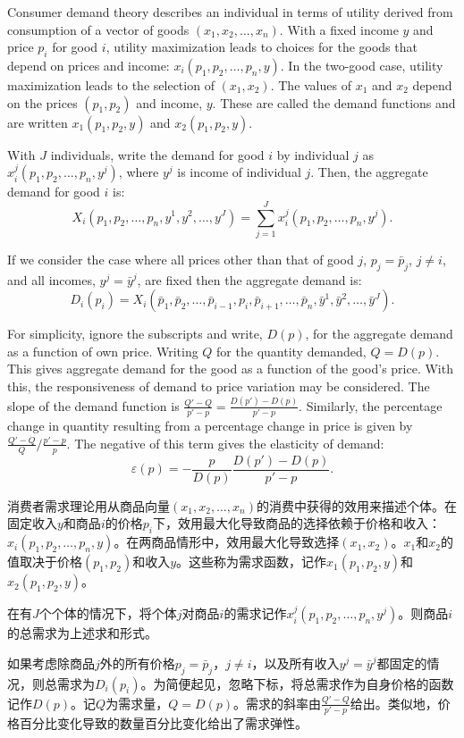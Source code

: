\begin{original}
Consumer demand theory describes an individual in terms of utility derived from consumption of a vector of goods $(x_1, x_2, \ldots, x_n)$. With a fixed income $y$ and price $p_i$ for good $i$, utility maximization leads to choices for the goods that depend on prices and income: $x_i(p_1, p_2, \ldots, p_n, y)$. In the two-good case, utility maximization leads to the selection of $(x_1, x_2)$. The values of $x_1$ and $x_2$ depend on the prices $(p_1, p_2)$ and income, $y$. These are called the demand functions and are written $x_1(p_1, p_2, y)$ and $x_2(p_1, p_2, y)$.

With $J$ individuals, write the demand for good $i$ by individual $j$ as $x_i^j(p_1, p_2, \ldots, p_n, y^j)$, where $y^j$ is income of individual $j$. Then, the aggregate demand for good $i$ is:
\[
X_i(p_1, p_2, \ldots, p_n, y^1, y^2, \ldots, y^J) = \sum_{j=1}^{J} x_i^j(p_1, p_2, \ldots, p_n, y^j).
\]

If we consider the case where all prices other than that of good $j$, $p_j = \bar{p}_j$, $j \neq i$, and all incomes, $y^j = \bar{y}^j$, are fixed then the aggregate demand is:
\[
D_i(p_i) = X_i(\bar{p}_1, \bar{p}_2, \ldots, \bar{p}_{i-1}, p_i, \bar{p}_{i+1}, \ldots, \bar{p}_n, \bar{y}^1, \bar{y}^2, \ldots, \bar{y}^J).
\]

For simplicity, ignore the subscripts and write, $D(p)$, for the aggregate demand as a function of own price. Writing $Q$ for the quantity demanded, $Q = D(p)$. This gives aggregate demand for the good as a function of the good's price. With this, the responsiveness of demand to price variation may be considered. The slope of the demand function is $\frac{Q' - Q}{p' - p} = \frac{D(p') - D(p)}{p' - p}$. Similarly, the percentage change in quantity resulting from a percentage change in price is given by $\frac{Q' - Q}{Q} / \frac{p' - p}{p}$. The negative of this term gives the elasticity of demand:
\[
\varepsilon(p) = -\frac{p}{D(p)} \frac{D(p') - D(p)}{p' - p}.
\]
\end{original}
\begin{translation}
消费者需求理论用从商品向量$(x_1, x_2, \ldots, x_n)$的消费中获得的效用来描述个体。在固定收入$y$和商品$i$的价格$p_i$下，效用最大化导致商品的选择依赖于价格和收入：$x_i(p_1, p_2, \ldots, p_n, y)$。在两商品情形中，效用最大化导致选择$(x_1, x_2)$。$x_1$和$x_2$的值取决于价格$(p_1, p_2)$和收入$y$。这些称为需求函数，记作$x_1(p_1, p_2, y)$和$x_2(p_1, p_2, y)$。

在有$J$个个体的情况下，将个体$j$对商品$i$的需求记作$x_i^j(p_1, p_2, \ldots, p_n, y^j)$。则商品$i$的总需求为上述求和形式。

如果考虑除商品$j$外的所有价格$p_j = \bar{p}_j$，$j \neq i$，以及所有收入$y^j = \bar{y}^j$都固定的情况，则总需求为$D_i(p_i)$。为简便起见，忽略下标，将总需求作为自身价格的函数记作$D(p)$。记$Q$为需求量，$Q = D(p)$。需求的斜率由$\frac{Q' - Q}{p' - p}$给出。类似地，价格百分比变化导致的数量百分比变化给出了需求弹性。
\end{translation}

